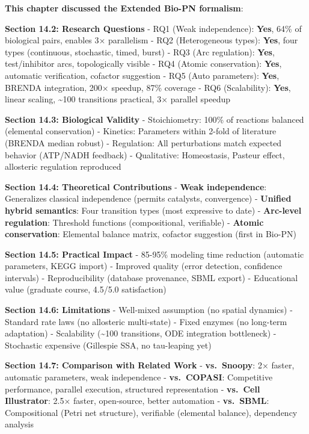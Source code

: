 \textbf{This chapter discussed the Extended Bio-PN formalism}:

\textbf{Section 14.2: Research Questions} - RQ1 (Weak independence):
\textbf{Yes}, 64\% of biological pairs, enables 3× parallelism - RQ2
(Heterogeneous types): \textbf{Yes}, four types (continuous, stochastic,
timed, burst) - RQ3 (Arc regulation): \textbf{Yes}, test/inhibitor arcs,
topologically visible - RQ4 (Atomic conservation): \textbf{Yes},
automatic verification, cofactor suggestion - RQ5 (Auto parameters):
\textbf{Yes}, BRENDA integration, 200× speedup, 87\% coverage - RQ6
(Scalability): \textbf{Yes}, linear scaling, \textasciitilde100
transitions practical, 3× parallel speedup

\textbf{Section 14.3: Biological Validity} - Stoichiometry: 100\% of
reactions balanced (elemental conservation) - Kinetics: Parameters
within 2-fold of literature (BRENDA median robust) - Regulation: All
perturbations match expected behavior (ATP/NADH feedback) - Qualitative:
Homeostasis, Pasteur effect, allosteric regulation reproduced

\textbf{Section 14.4: Theoretical Contributions} - \textbf{Weak
independence}: Generalizes classical independence (permits catalysts,
convergence) - \textbf{Unified hybrid semantics}: Four transition types
(most expressive to date) - \textbf{Arc-level regulation}: Threshold
functions (compositional, verifiable) - \textbf{Atomic conservation}:
Elemental balance matrix, cofactor suggestion (first in Bio-PN)

\textbf{Section 14.5: Practical Impact} - 85-95\% modeling time
reduction (automatic parameters, KEGG import) - Improved quality (error
detection, confidence intervals) - Reproducibility (database provenance,
SBML export) - Educational value (graduate course, 4.5/5.0 satisfaction)

\textbf{Section 14.6: Limitations} - Well-mixed assumption (no spatial
dynamics) - Standard rate laws (no allosteric multi-state) - Fixed
enzymes (no long-term adaptation) - Scalability (\textasciitilde100
transitions, ODE integration bottleneck) - Stochastic expensive
(Gillespie SSA, no tau-leaping yet)

\textbf{Section 14.7: Comparison with Related Work} -
\textbf{vs.~Snoopy}: 2× faster, automatic parameters, weak independence
- \textbf{vs.~COPASI}: Competitive performance, parallel execution,
structured representation - \textbf{vs.~Cell Illustrator}: 2.5× faster,
open-source, better automation - \textbf{vs.~SBML}: Compositional (Petri
net structure), verifiable (elemental balance), dependency analysis

